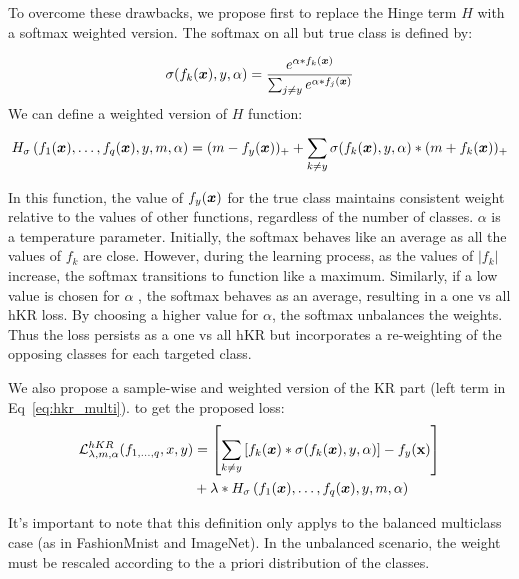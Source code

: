 
\iftrue
To overcome these drawbacks, we propose first to replace the Hinge term $H$ with a softmax weighted version. The softmax on all but true class is defined by:

$$
\sigma(f_k(\bm{x}),y,\alpha) = \frac{e^{\alpha*f_k(\bm{x})}}{\sum_{j\neq y} e^{\alpha*f_j(\bm{x})}}
$$
We can define a weighted version of $H$ function:

$$H_{\sigma}\left(f_1(\bm{x}),\ldots, f_q(\bm{x}),y ,m,\alpha\right) = (m- f_y(\bm{x}))_+  + \sum_{k\neq y} \sigma(f_k(\bm{x}),y,\alpha)*(m +f_k(\bm{x}))_+
$$
\fi

In this function, the value of $f_y(\bm{x})$ for the true class maintains consistent weight relative to the values of other functions, regardless of the number of classes. $\alpha$ is a temperature parameter. Initially, the softmax behaves like an average as all the values of $f_k$ are close. However, during the learning process, as the values of $|f_k|$ increase, the softmax transitions to function like a maximum. Similarly, if a low value is chosen for $\alpha$ 
, the softmax behaves as an average, resulting in a one vs all hKR loss. 
By choosing a higher value for $\alpha$, the softmax unbalances the weights. Thus 
the loss persists as a one vs all hKR but incorporates a re-weighting of the opposing classes for each targeted class. 

\iftrue
We also propose a sample-wise and weighted version of the KR part (left term in Eq~\ref{eq:hkr_multi}). to get the proposed loss: 
\begin{equation}
\label{eq:hkr_multiv2}
\begin{split}
\mathcal{L}^{hKR}_{\lambda,m, \alpha}(f_{1,\ldots,q},x,y)  &= \left[ \sum_{k\neq y} \left[ f_k(\bm{x})*\sigma(f_k(\bm{x}),y,\alpha)  \right] -f_y(\textbf{x}) \right] \\
& +\lambda*H_{\sigma}\left(f_1(\bm{x}),\ldots, f_q(\bm{x}),y, m,\alpha\right) 
 \end{split}
\end{equation}
\fi
It's important to note that this definition only applys to the balanced multiclass case (as in FashionMnist and ImageNet). In the unbalanced scenario, the weight must be rescaled according to the a priori distribution of the classes.




